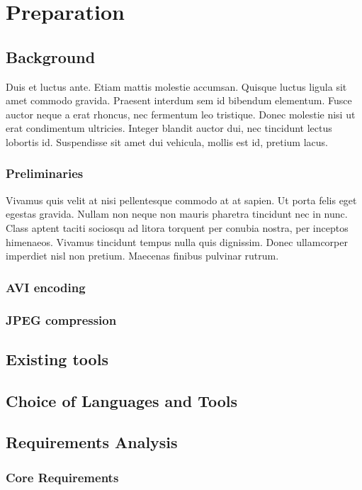 \documentclass[paper=a4, fontsize=11pt,twoside]{scrartcl}    %
\begin{document}
\section{Preparation}
\subsection{Background}
Duis et luctus ante. Etiam mattis molestie accumsan. Quisque luctus ligula sit amet commodo gravida. Praesent interdum sem id bibendum elementum. Fusce auctor neque a erat rhoncus, nec fermentum leo tristique. Donec molestie nisi ut erat condimentum ultricies. Integer blandit auctor dui, nec tincidunt lectus lobortis id. Suspendisse sit amet dui vehicula, mollis est id, pretium lacus.
\subsubsection{Preliminaries}
Vivamus quis velit at nisi pellentesque commodo at at sapien. Ut porta felis eget egestas gravida. Nullam non neque non mauris pharetra tincidunt nec in nunc. Class aptent taciti sociosqu ad litora torquent per conubia nostra, per inceptos himenaeos. Vivamus tincidunt tempus nulla quis dignissim. Donec ullamcorper imperdiet nisl non pretium. Maecenas finibus pulvinar rutrum. 

\subsubsection{AVI encoding}

\subsubsection{JPEG compression}

\subsection{Existing tools}

\subsection{Choice of Languages and Tools}

\subsection{Requirements Analysis}

\subsubsection{Core Requirements}
\end{document}
